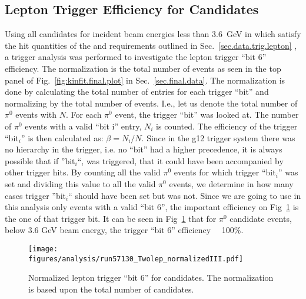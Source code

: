 \subsection{Lepton Trigger Efficiency for \pizT Candidates}\label{sec:analysis.trigger.verify}
Using all \pizT candidates for incident beam energies less than 3.6~GeV in which satisfy the hit quantities of the and  requirements outlined in Sec.~\ref{sec.data.trig.lepton} , a trigger analysis was performed to investigate the lepton trigger ``bit 6'' efficiency. The normalization is the total number of 
\pizT events as seen in the top panel of Fig.~\ref{fig:kinfit.final.plot} in Sec.~\ref{sec.final.data}.
The normalization is done by calculating the total number of entries for each trigger ``bit'' and normalizing by the total number of events. I.e., let us denote the total number of $\pi^0$ events with $N$. For each $\pi^0$ event, the trigger ``bit'' was looked at. The number of $\pi^0$ events with a valid “bit i” entry, $N_i$ is counted. The efficiency of the trigger ``bit$_i$'' is then calculated as: $\beta = N_i/N$. Since in the g12 trigger system there was no hierarchy in the trigger, i.e. no ``bit'' had a higher precedence, it is always possible that if ''bit$_i$``, was triggered, that it could have been accompanied by other trigger hits. By counting all the valid $\pi^0$ events for which trigger ``bit$_i$'' was set and dividing this value to all the valid $\pi^0$ events, we determine in how many cases trigger ''bit$_i$`` should have been set but was not.  Since we are going to use in this analysis only events with a valid ``bit 6'', the important efficiency on Fig~\ref{fig:Leptrigger}  is the one of that trigger bit. It can be seen in Fig~\ref{fig:Leptrigger}  that for $\pi^0$ candidate events, below 3.6 GeV beam energy, the trigger “bit 6” efficiency ~~100\%.
							
	\begin{figure}[h!]\begin{center}
		\texttt{[image: \\figures/analysis/run57130\_Twolep\_normalizedIII.pdf]}
		\caption[Normalized Lepton Trigger ``Bit 6'' for \piz candidates]{\label{fig:Leptrigger}Normalized lepton trigger ``bit 6'' for \pizT candidates. The normalization is based upon the total number of \pizT candidates.}
	\end{center}\end{figure} 